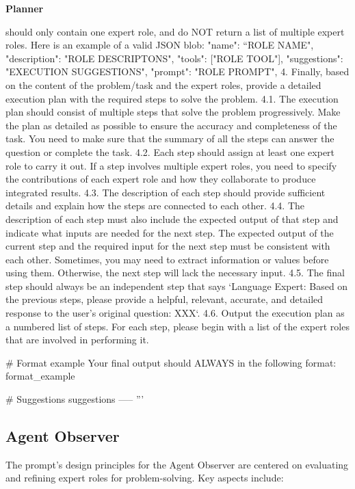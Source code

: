 \begin{frame}[Prompt]{\textbf{Planner}}
\begin{code}
should only contain one expert role, and do NOT return a list of multiple expert 
roles. Here is an example of a valid JSON blob:
{{{{
    "name": “ROLE NAME",
    "description": "ROLE DESCRIPTONS",
    "tools": ["ROLE TOOL"],
    "suggestions": "EXECUTION SUGGESTIONS",
    "prompt": "ROLE PROMPT",
}}}}
4. Finally, based on the content of the problem/task and the expert roles, provide 
a detailed execution plan with the required steps to solve the problem.
4.1. The execution plan should consist of multiple steps that solve the problem 
progressively. Make the plan as detailed as possible to ensure the accuracy and 
completeness of the task. You need to make sure that the summary of all the steps 
can answer the question or complete the task.
4.2. Each step should assign at least one expert role to carry it out. If a step 
involves multiple expert roles, you need to specify the contributions of each 
expert role and how they collaborate to produce integrated results. 
4.3. The description of each step should provide sufficient details and explain how 
the steps are connected to each other.
4.4. The description of each step must also include the expected output of that 
step and indicate what inputs are needed for the next step. The expected output of 
the current step and the required input for the next step must be consistent with 
each other. Sometimes, you may need to extract information or values before using 
them. Otherwise, the next step will lack the necessary input.
4.5. The final step should always be an independent step that says `Language 
Expert: Based on the previous steps, please provide a helpful, relevant, accurate, 
and detailed response to the user's original question: XXX`.
4.6. Output the execution plan as a numbered list of steps. For each step, please 
begin with a list of the expert roles that are involved in performing it.

# Format example
Your final output should ALWAYS in the following format:
{format_example}

# Suggestions
{suggestions}
-----
'''
\end{code}
\end{frame}


\subsection{Agent Observer}

The prompt's design principles for the Agent Observer are centered on evaluating and refining expert roles for problem-solving. Key aspects include:

